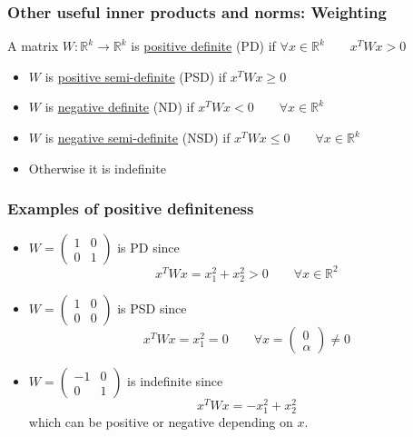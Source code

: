 \documentclass{beamer}
\begin{document}
\begin{frame}\frametitle{Other useful inner products and norms: Weighting}
\begin{definition}
A matrix $W : \mathbb{R}^k \to \mathbb{R}^k$ is \underline{positive definite} (PD) if $\forall x \in \mathbb{R}^k \quad \quad x^TWx > 0$\\
\begin{itemize}
  \item $W$ is \underline{positive semi-definite} (PSD) if $x^TWx \geq 0$
  \item $W$ is \underline{negative definite} (ND) if $x^TWx < 0 \qquad \forall x \in \mathbb{R}^k$
  \item $W$ is \underline{negative semi-definite} (NSD) if $x^TWx \leq 0 \qquad \forall x \in \mathbb{R}^k$
  \item Otherwise it is indefinite
\end{itemize}
\end{definition}
\end{frame}

\begin{frame}\frametitle{Examples of positive definiteness}
\begin{itemize}
\item $W = \left( \begin{array}{cc} 1 & 0 \\ 0 & 1 \end{array} \right)$ is PD since
\[ x^TWx = x_1^2 + x_2^2 > 0 \qquad \forall x \in \mathbb{R}^2 \]
\item $W = \left( \begin{array}{cc} 1 & 0 \\ 0 & 0 \end{array} \right)$ is PSD since
\[ x^TWx = x_1^2 = 0 \qquad \forall x = \left( \begin{array}{c} 0\\\alpha\end{array} \right) \neq 0 \]
\item $W = \left( \begin{array}{cc} -1 & 0 \\ 0 & 1 \end{array} \right)$ is indefinite since
\[ x^TWx = -x_1^2 + x_2^2 \] which can be positive or negative depending on $x$.
\end{itemize}
\end{frame}
\end{document}

